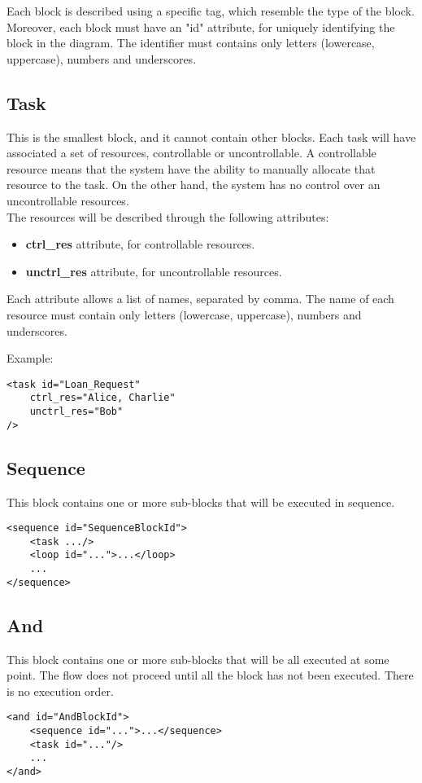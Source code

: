 \documentclass{article}
\begin{document}
\noindent Each block is described using a specific tag, which resemble the type of the block. Moreover, each block must have an "id" attribute, for uniquely identifying the block in the diagram. The identifier must contains only letters (lowercase, uppercase), numbers and underscores.

\subsection{Task}
This is the smallest block, and it cannot contain other blocks.  
Each task will have associated a set of resources, controllable or uncontrollable. A controllable resource means that the system have the ability to manually allocate that resource to the task. On the other hand, the system has no control over an uncontrollable resources.
\\
The resources will be described through the following attributes:
\begin{itemize}
    \item \textbf{ctrl\_res} attribute, for controllable resources.
    \item \textbf{unctrl\_res} attribute, for uncontrollable resources.
\end{itemize}
Each attribute allows a list of names, separated by comma. The name of each resource must contain only letters (lowercase, uppercase), numbers and underscores.

\noindent Example:
\begin{lstlisting}
<task id="Loan_Request"
    ctrl_res="Alice, Charlie"
    unctrl_res="Bob"
/>
\end{lstlisting}

\subsection{Sequence}
This block contains one or more sub-blocks that will be executed in sequence.
\begin{lstlisting}
<sequence id="SequenceBlockId">
    <task .../>
    <loop id="...">...</loop>
    ...
</sequence>
\end{lstlisting}

\subsection{And}
This block contains one or more sub-blocks that will be all executed at some point. The flow does not proceed until all the block has not been executed. There is no execution order.
\begin{lstlisting}
<and id="AndBlockId">
    <sequence id="...">...</sequence>
    <task id="..."/>
    ...
</and>
\end{lstlisting}
\end{document}
